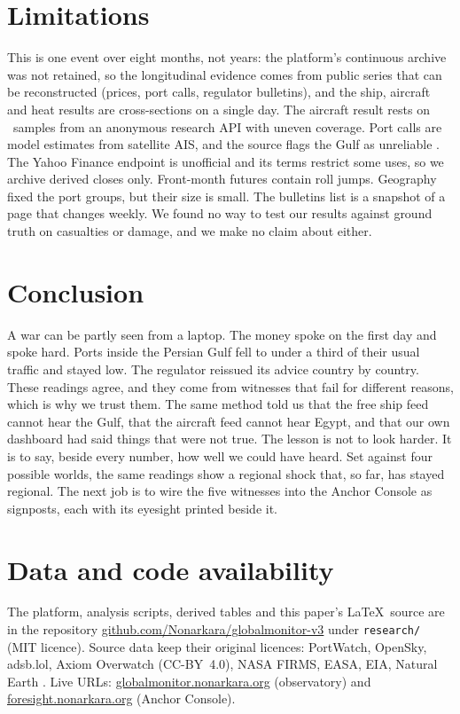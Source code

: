 \documentclass[10pt,twocolumn,letterpaper]{article}
\begin{document}
\section{Limitations}
This is one event over eight months, not years: the platform's continuous archive was not retained, so the longitudinal evidence comes from public series that can be reconstructed (prices, port calls, regulator bulletins), and the ship, aircraft and heat results are cross-sections on a single day. The aircraft result rests on \AirN\ samples from an anonymous research API with uneven coverage. Port calls are model estimates from satellite AIS, and the source flags the Gulf as unreliable \citep{eia2026steo}. The Yahoo Finance endpoint is unofficial and its terms restrict some uses, so we archive derived closes only. Front-month futures contain roll jumps. Geography fixed the port groups, but their size is small. The bulletins list is a snapshot of a page that changes weekly. We found no way to test our results against ground truth on casualties or damage, and we make no claim about either.

\section{Conclusion}
A war can be partly seen from a laptop. The money spoke on the first day and spoke hard. Ports inside the Persian Gulf fell to under a third of their usual traffic and stayed low. The regulator reissued its advice country by country. These readings agree, and they come from witnesses that fail for different reasons, which is why we trust them. The same method told us that the free ship feed cannot hear the Gulf, that the aircraft feed cannot hear Egypt, and that our own dashboard had said things that were not true. The lesson is not to look harder. It is to say, beside every number, how well we could have heard. Set against four possible worlds, the same readings show a regional shock that, so far, has stayed regional. The next job is to wire the five witnesses into the Anchor Console as signposts, each with its eyesight printed beside it.

\section*{Data and code availability}\label{sec:avail}
The platform, analysis scripts, derived tables and this paper's \LaTeX\ source are in the repository \href{https://github.com/Nonarkara/globalmonitor-v3}{github.com/Nonarkara/globalmonitor-v3} under \texttt{research/} (MIT licence). Source data keep their original licences: PortWatch, OpenSky, adsb.lol, Axiom Overwatch (CC-BY~4.0), NASA FIRMS, EASA, EIA, Natural Earth \citep{naturalearth}. Live URLs: \href{https://globalmonitor.nonarkara.org}{globalmonitor.nonarkara.org} (observatory) and \href{https://foresight.nonarkara.org}{foresight.nonarkara.org} (Anchor Console).
\end{document}
